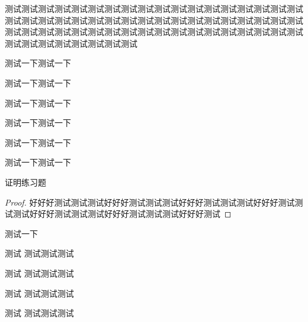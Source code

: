 测试测试测试测试测试测试测试测试测试测试测试测试测试测试测试测试测试测试测试测试测试测试测试测试测试测试测试测试测试测试测试测试测试测试测试测试测试测试测试测试测试测试测试测试测试测试测试测试测试测试测试测试测试测试测试测试测试测试测试测试测试测试

\begin{definition}[测试定义]
	测试一下测试一下
\end{definition}

\begin{theorem}[测试定理]
	测试一下测试一下
\end{theorem}

\begin{proposition}[测试命题]
	测试一下测试一下
\end{proposition}

\begin{corollary}[测试推论]
	测试一下测试一下
\end{corollary}

\begin{lemma}[测试引理]
	测试一下测试一下
\end{lemma}

\begin{example}[测试示例]
	测试一下测试一下
\end{example}

\begin{exercise}[练习]
	证明练习题
\end{exercise}

\begin{proof}
	好好好测试测试测试好好好测试测试测试好好好测试测试测试好好好测试测试测试好好好测试测试测试好好好测试测试测试好好好测试
\end{proof}

\begin{remark}
	测试一下
\end{remark}


\newpage
\begin{box1}{测试}
	测试测试测试
\end{box1}

\begin{box2}{测试}
	测试测试测试
\end{box2}

\begin{box3}{测试}
	测试测试测试
\end{box3}

\begin{box4}{测试}
	测试测试测试
\end{box4}
